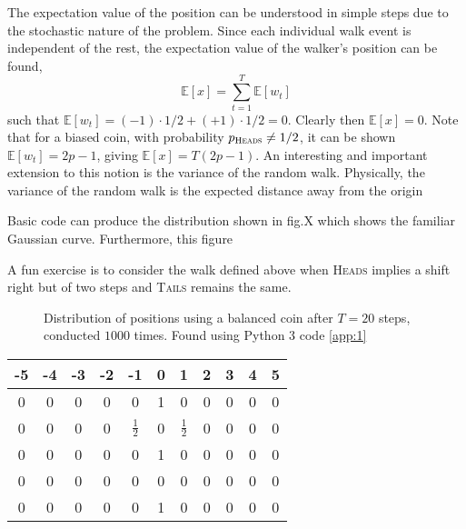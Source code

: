\documentclass{article}
\begin{document}
The expectation value of the position can be understood in simple steps due to the stochastic nature of the problem. Since each individual walk event is independent of the rest, the expectation value of the walker's position can be found,
\begin{equation}
    \mathbb{E}[x] = \sum_{t=1}^T \mathbb{E}[w_t]
\end{equation}
such that $\mathbb{E}[w_t] = (-1)\cdot 1/2 + (+1)\cdot 1/2 =0$. Clearly then $\mathbb{E}[x]=0$. Note that for a biased coin, with probability $p_{\textsc{Heads}}\neq 1/2$, it can be shown $\mathbb{E}[w_t] = 2p-1$, giving $\mathbb{E}[x] = T(2p-1)$. An interesting and important extension to this notion is the variance of the random walk. Physically, the variance of the random walk is the expected distance away from the origin

Basic code can produce the distribution shown in fig.X which shows the familiar Gaussian curve. Furthermore, this figure 

A fun exercise is to consider the walk defined above when \textsc{Heads} implies a shift right but of two steps and \textsc{Tails} remains the same.

\begin{figure}[h!]
    \centering
    \caption{Distribution of positions using a balanced coin after $T=20$ steps, conducted $1000$ times. Found using Python 3 code \ref{app:1}}
    \label{fig:CRW}
\end{figure} 

\begin{center}
\begin{tabular}{|c|c|c|c|c|c|c|c|c|c|c|} 
\hline
    -5&-4&-3&-2&-1&0&1&2&3&4&5\\\hline\hline
     0&0 &0 &0 &0 &1&0&0&0&0&0\\\hline
     0&0 &0 &0 &$\frac{1}{2}$ &0&$\frac{1}{2}$&0&0&0&0\\\hline
     0&0 &0 &0 &0 &1&0&0&0&0&0\\\hline
     0&0 &0 &0 &0 &0&0&0&0&0&0\\\hline
     0&0 &0 &0 &0 &1&0&0&0&0&0\\\hline
 \hline
\end{tabular}
\end{center}
\end{document}
